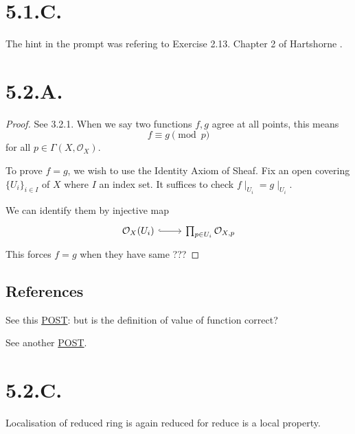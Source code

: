 \section{5.1.C.}

The hint in the prompt was refering to Exercise 2.13.  Chapter 2 of Hartshorne \cite{hartshorne2013algebraic}.

\section{5.2.A.}

\begin{proof}
    
See 3.2.1. When we say two functions $f,g$ agree at all points, this means 
\[f\equiv g\pmod{p}\] for all $p\in \Gamma(X,\mathcal O_X)$.    

To prove $f=g$, we wish to use the Identity Axiom of Sheaf. Fix an open covering $\{U_i\}_{i\in I}$ of $X$ where $I$ an index set. It suffices to check $f\mid_{U_i}=g\mid_{U_i}$.

We can identify them by injective map 
\[\begin{tikzcd}
	{\mathcal O_X(U_i)} & {\prod_{p\in U_i}\mathcal O_{X,p}}
	\arrow[hook, from=1-1, to=1-2]
\end{tikzcd}\]
This forces $f=g$ when they have same ???

\end{proof}

\subsection{References}

See this \href{https://math.stackexchange.com/questions/3834821/equality-of-functions-in-a-reduced-scheme}{POST}: but is the definition of value of function correct?

See another \href{https://math.stackexchange.com/questions/1157904/functions-on-reduced-schemes-are-determined-by-their-values-at-each-point}{POST}.

\section{5.2.C.}

Localisation of reduced ring is again reduced for reduce is a local property. 

